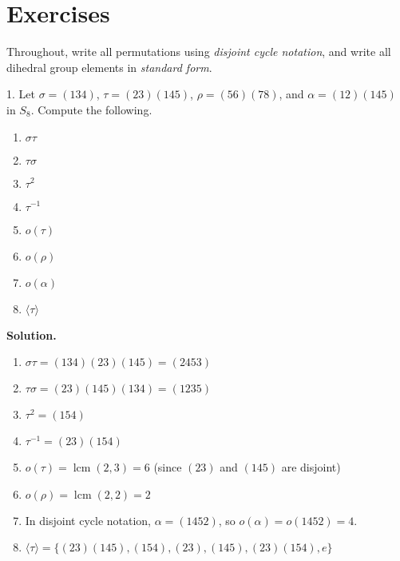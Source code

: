 \documentclass[10pt,]{book}
\theoremstyle{plain}
\theoremstyle{definition}
\theoremstyle{definition}
\theoremstyle{definition}
\theoremstyle{definition}
\numberwithin{equation}{section}
\DeclareMathOperator{\lcm}{lcm}
\begin{document}
\section[{Exercises}]{Exercises}\label{exercises-7}
Throughout, write all permutations using \emph{disjoint cycle notation}, and write all dihedral group elements in \emph{standard form}.%
\begin{exerciselist}
\item[1.]\hypertarget{exercise-41}{}Let \(\sigma=(134)\), \(\tau=(23)(145)\), \(\rho=(56)(78)\), and \(\alpha=(12)(145)\) in \(S_8\). Compute the following.%
\par
\leavevmode%
\begin{enumerate}[label=(\alph*)]
\item\hypertarget{li-361}{}\(\sigma \tau\)%
\item\hypertarget{li-362}{}\(\tau \sigma\)%
\item\hypertarget{li-363}{}\(\tau^2\)%
\item\hypertarget{li-364}{}\(\tau^{-1}\)%
\item\hypertarget{li-365}{}\(o(\tau)\)%
\item\hypertarget{li-366}{}\(o(\rho)\)%
\item\hypertarget{li-367}{}\(o(\alpha)\)%
\item\hypertarget{li-368}{}\(\langle \tau\rangle\)%
\end{enumerate}
%
\par\smallskip
\par\smallskip
\noindent\textbf{Solution.}\hypertarget{solution-41}{}\quad
\leavevmode%
\begin{enumerate}[label=(\alph*)]
\item\hypertarget{li-369}{}\(\sigma \tau= (134)(23)(145)=(2453)\)%
\item\hypertarget{li-370}{}\(\tau \sigma=  (23)(145)(134)=(1235)\)%
\item\hypertarget{li-371}{}\(\tau^2=(154)\)%
\item\hypertarget{li-372}{}\(\tau^{-1}=(23)(154)\)%
\item\hypertarget{li-373}{}\(o(\tau)=\lcm(2,3)=6\) (since \((23)\) and \((145)\) are disjoint)%
\item\hypertarget{li-374}{}\(o(\rho)=\lcm(2,2)=2\)%
\item\hypertarget{li-375}{}In disjoint cycle notation, \(\alpha=(1452)\), so \(o(\alpha)=o(1452)=4\).%
\item\hypertarget{li-376}{}\(\langle \tau\rangle =\{(23)(145), (154), (23), (145), (23)(154), e\}\)%

\end{enumerate}
\end{exerciselist}
\end{document}
